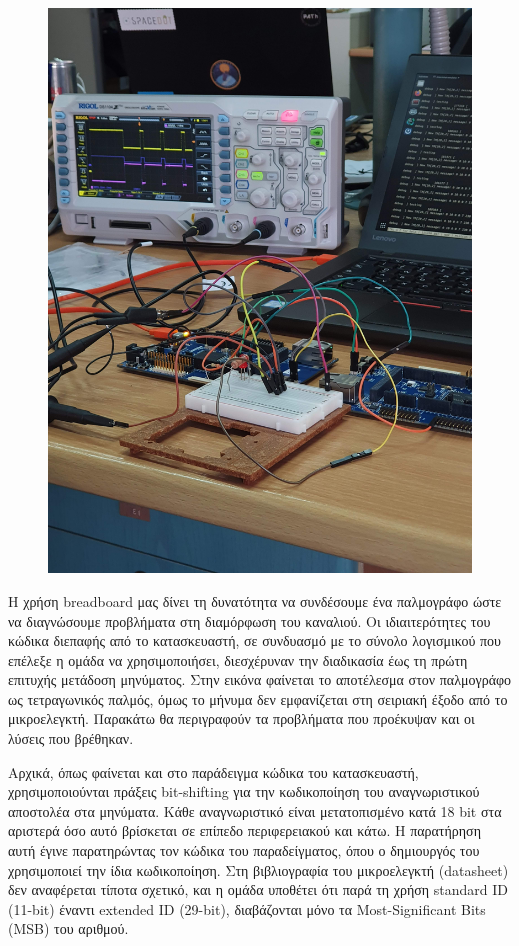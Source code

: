 \documentclass[a4paper,nobib,justified]{tufte-book}
\begin{document}
\begin{figure}[ht]
	\includegraphics[angle=270,origin=c]{media/images/lab-wiring-scope.jpg}
\end{figure}

Η χρήση breadboard μας δίνει τη δυνατότητα να συνδέσουμε ένα παλμογράφο ώστε να διαγνώσουμε προβλήματα στη διαμόρφωση του καναλιού. Οι ιδιαιτερότητες του κώδικα διεπαφής από το κατασκευαστή, σε συνδυασμό με το σύνολο λογισμικού που επέλεξε η ομάδα να χρησιμοποιήσει, διεσχέρυναν την διαδικασία έως τη πρώτη επιτυχής μετάδοση μηνύματος. Στην εικόνα φαίνεται το αποτέλεσμα στον παλμογράφο ως τετραγωνικός παλμός, όμως το μήνυμα δεν εμφανίζεται στη σειριακή έξοδο από το μικροελεγκτή. Παρακάτω θα περιγραφούν τα προβλήματα που προέκυψαν και οι λύσεις που βρέθηκαν.

Αρχικά, όπως φαίνεται και στο παράδειγμα κώδικα του κατασκευαστή, χρησιμοποιούνται πράξεις bit-shifting για την κωδικοποίηση του αναγνωριστικού αποστολέα στα μηνύματα. Κάθε αναγνωριστικό είναι μετατοπισμένο κατά 18 bit στα αριστερά όσο αυτό βρίσκεται σε επίπεδο περιφερειακού και κάτω. Η παρατήρηση αυτή έγινε παρατηρώντας τον κώδικα του παραδείγματος, όπου ο δημιουργός του χρησιμοποιεί την ίδια κωδικοποίηση. Στη βιβλιογραφία του μικροελεγκτή (datasheet) δεν αναφέρεται τίποτα σχετικό, και η ομάδα υποθέτει ότι παρά τη χρήση standard ID (11-bit) έναντι extended ID (29-bit), διαβάζονται μόνο τα Most-Significant Bits (MSB) του αριθμού. 
\end{document}
